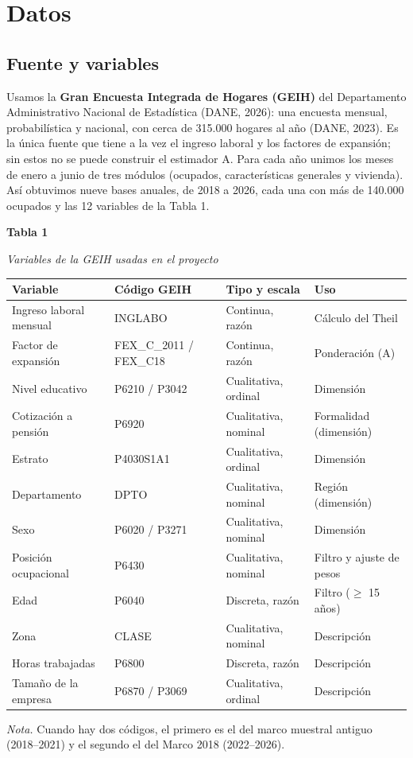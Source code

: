 \documentclass[12pt,letterpaper]{article}
\newcommand{\apa}[4]{%
  \singlespacing\raggedright
  {\bfseries #1\par}\vspace{0.4\baselineskip}
  {\itshape #2\par}\vspace{0.4\baselineskip}
  #3\par\vspace{0.3\baselineskip}
  {\small {\itshape Nota.} #4\par}}
\begin{document}
\section{Datos}

\subsection{Fuente y variables}

Usamos la \textbf{Gran Encuesta Integrada de Hogares (GEIH)} del Departamento Administrativo Nacional de Estadística (DANE, 2026): una encuesta mensual, probabilística y nacional, con cerca de 315.000 hogares al año (DANE, 2023). Es la única fuente que tiene a la vez el ingreso laboral y los factores de expansión; sin estos no se puede construir el estimador A. Para cada año unimos los meses de enero a junio de tres módulos (ocupados, características generales y vivienda). Así obtuvimos nueve bases anuales, de 2018 a 2026, cada una con más de 140.000 ocupados y las 12 variables de la Tabla 1.

\begin{table}[!htb]
\apa{Tabla 1}{Variables de la GEIH usadas en el proyecto}{%
  \small\renewcommand{\arraystretch}{1.0}
  \begin{tabular}{@{}>{\raggedright\arraybackslash}p{1.55in}>{\raggedright\arraybackslash}p{1.55in}>{\raggedright\arraybackslash}p{1.3in}>{\raggedright\arraybackslash}p{1.6in}@{}}
    \toprule
    Variable & Código GEIH & Tipo y escala & Uso \\
    \midrule
    Ingreso laboral mensual & INGLABO & Continua, razón & Cálculo del Theil \\
    Factor de expansión & FEX\_C\_2011 / FEX\_C18 & Continua, razón & Ponderación (A) \\
    Nivel educativo & P6210 / P3042 & Cualitativa, ordinal & Dimensión \\
    Cotización a pensión & P6920 & Cualitativa, nominal & Formalidad (dimensión) \\
    Estrato & P4030S1A1 & Cualitativa, ordinal & Dimensión \\
    Departamento & DPTO & Cualitativa, nominal & Región (dimensión) \\
    Sexo & P6020 / P3271 & Cualitativa, nominal & Dimensión \\
    Posición ocupacional & P6430 & Cualitativa, nominal & Filtro y ajuste de pesos \\
    Edad & P6040 & Discreta, razón & Filtro ($\geq$ 15 años) \\
    Zona & CLASE & Cualitativa, nominal & Descripción \\
    Horas trabajadas & P6800 & Discreta, razón & Descripción \\
    Tamaño de la empresa & P6870 / P3069 & Cualitativa, ordinal & Descripción \\
    \bottomrule
  \end{tabular}}{%
  Cuando hay dos códigos, el primero es el del marco muestral antiguo (2018--2021) y el segundo el del Marco 2018 (2022--2026).}
\end{table}
\end{document}

